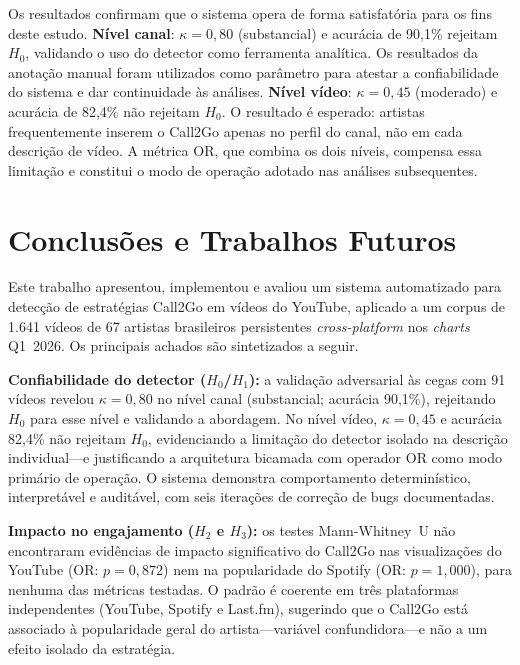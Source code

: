 ﻿\documentclass[12pt]{article}
\begin{document}
Os resultados confirmam que o sistema opera de forma satisfatória para os fins
deste estudo. \textbf{Nível canal}: $\kappa = 0{,}80$ (substancial) e acurácia
de 90,1\% rejeitam $H_0$, validando o uso do detector como ferramenta
analítica. Os resultados da anotação manual foram utilizados como parâmetro
para atestar a confiabilidade do sistema e dar continuidade às análises.
\textbf{Nível vídeo}: $\kappa = 0{,}45$ (moderado) e acurácia de 82,4\% não
rejeitam $H_0$. O resultado é esperado: artistas frequentemente inserem o
Call2Go apenas no perfil do canal, não em cada descrição de vídeo. A métrica
OR, que combina os dois níveis, compensa essa limitação e constitui o modo
de operação adotado nas análises subsequentes.

\section{Conclusões e Trabalhos Futuros}
\label{sec:conclusao}

Este trabalho apresentou, implementou e avaliou um sistema automatizado para
detecção de estratégias Call2Go em vídeos do YouTube, aplicado a um corpus
de 1.641 vídeos de 67 artistas brasileiros persistentes \textit{cross-platform}
nos \textit{charts} Q1~2026. Os principais achados são sintetizados a seguir.

\textbf{Confiabilidade do detector ($H_0$/$H_1$):} a validação adversarial
às cegas com 91 vídeos revelou $\kappa = 0{,}80$ no nível canal (substancial;
acurácia 90,1\%), rejeitando $H_0$ para esse nível e validando a abordagem.
No nível vídeo, $\kappa = 0{,}45$ e acurácia 82,4\% não rejeitam $H_0$,
evidenciando a limitação do detector isolado na descrição individual---e
justificando a arquitetura bicamada com operador OR como modo primário de
operação. O sistema demonstra comportamento determinístico, interpretável e
auditável, com seis iterações de correção de bugs documentadas.

\textbf{Impacto no engajamento ($H_2$ e $H_3$):} os testes Mann-Whitney~U
não encontraram evidências de impacto significativo do Call2Go nas
visualizações do YouTube (OR: $p = 0{,}872$) nem na popularidade do Spotify
(OR: $p = 1{,}000$), para nenhuma das métricas testadas. O padrão é coerente
em três plataformas independentes (YouTube, Spotify e Last.fm), sugerindo que
o Call2Go está associado à popularidade geral do artista---variável
confundidora---e não a um efeito isolado da estratégia.
\end{document}
